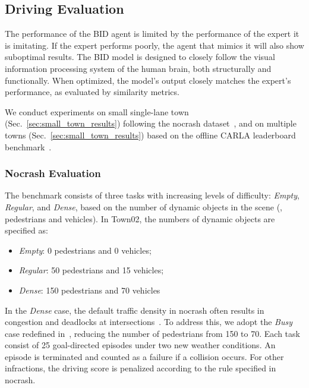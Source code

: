 \subsection{Driving Evaluation}
\label{sec:Metrics}
\hspace{1pc}The performance of the BID agent is limited by the performance of the expert it is imitating. 
If the expert performs poorly, the agent that mimics it will also show suboptimal results. 
The BID model is designed to closely follow the visual information processing system of the human brain, both structurally and functionally. 
When optimized, the model’s output closely matches the expert’s performance, as evaluated by similarity metrics.


We conduct experiments on small single-lane town (Sec.~\ref{sec:small_town_results}) following the nocrash dataset~\cite{Zhang:2021,Hu:2022}, and on multiple towns (Sec.~\ref{sec:small_town_results}) based on the offline CARLA leaderboard benchmark~\cite{Zhang:2021,Hu:2022}. 


\subsubsection{Nocrash Evaluation}\label{nocrash_metrics}

\hspace{1pc}The benchmark consists of three tasks with increasing levels of difficulty: \emph{Empty}, \emph{Regular}, and \emph{Dense}, based on the number of dynamic objects in the scene ({\ie}, pedestrians and vehicles). 
In Town02, the numbers of dynamic objects are specified as:
\begin{itemize}
	\item \emph{Empty}: 0 pedestrians and 0 vehicles;
	\item \emph{Regular}: 50 pedestrians and 15 vehicles;
	\item \emph{Dense}: 150 pedestrians and 70 vehicles
\end{itemize}
In the \emph{Dense} case, the default traffic density in nocrash often results in congestion and deadlocks at intersections~\cite{Zhang:2021}. 
To address this, we adopt the \emph{Busy} case redefined in~\cite{Zhang:2021}, reducing the number of pedestrians from 150 to 70. 
Each task consist of 25 goal-directed episodes under two new weather conditions.
An episode is terminated and counted as a failure if a collision occurs. 
For other infractions, the driving score is penalized according to the rule specified in nocrash. 


